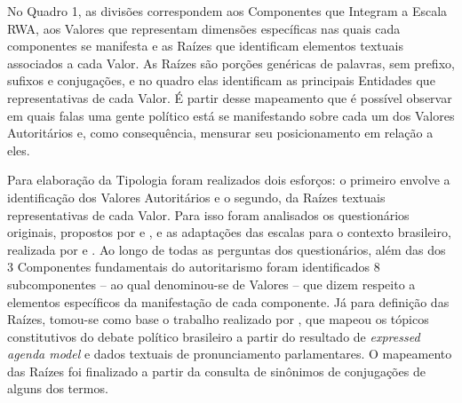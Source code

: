 \documentclass[
12pt,				%
openright,			%
twoside,			%
a4paper,			%
english,			%
french,				%
spanish,			%
brazil				%
]{abntex2}
\begin{document}
No Quadro 1, as divisões correspondem aos Componentes que Integram a Escala RWA, aos Valores que representam dimensões específicas nas quais cada componentes se manifesta e as Raízes que identificam elementos textuais associados a cada Valor. As Raízes são porções genéricas de palavras, sem prefixo, sufixos e conjugações, e no quadro elas identificam as principais Entidades que representativas de cada Valor. É partir desse mapeamento que é possível observar em quais falas uma gente político está se manifestando sobre cada um dos Valores Autoritários e, como consequência, mensurar seu posicionamento em relação a eles.

Para elaboração da Tipologia foram realizados dois esforços: o primeiro envolve a identificação dos Valores Autoritários e o segundo, da Raízes textuais representativas de cada Valor. Para isso foram analisados os questionários originais, propostos por  e , e as adaptações das escalas para o contexto brasileiro, realizada por  e . Ao longo de todas as perguntas dos questionários, além das dos 3 Componentes fundamentais do autoritarismo foram identificados 8 subcomponentes -- ao qual denominou-se de Valores -- que dizem respeito a elementos específicos da manifestação de cada componente. Já para definição das Raízes, tomou-se como base o trabalho realizado por , que mapeou os tópicos constitutivos do debate político brasileiro a partir do resultado de \textit{expressed agenda model} e dados textuais de pronunciamento parlamentares. O mapeamento das Raízes foi finalizado a partir da consulta de sinônimos de conjugações de alguns dos termos. 
\end{document}
